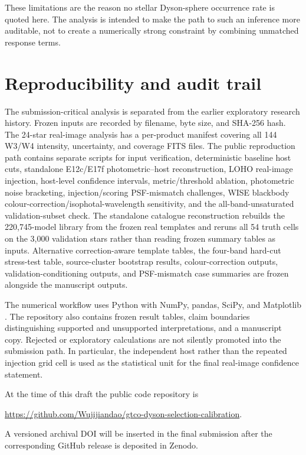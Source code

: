 \documentclass[fleqn,usenatbib]{mnras}
\begin{document}
These limitations are the reason no stellar Dyson-sphere occurrence rate is quoted here. The analysis is intended to make the path to such an inference more auditable, not to create a numerically strong constraint by combining unmatched response terms.

\section{Reproducibility and audit trail}
\label{sec:repro}

The submission-critical analysis is separated from the earlier exploratory research history. Frozen inputs are recorded by filename, byte size, and SHA-256 hash. The 24-star real-image analysis has a per-product manifest covering all 144 W3/W4 intensity, uncertainty, and coverage FITS files. The public reproduction path contains separate scripts for input verification, deterministic baseline host cuts, standalone E12c/E17f photometric--host reconstruction, LOHO real-image injection, host-level confidence intervals, metric/threshold ablation, photometric noise bracketing, injection/scoring PSF-mismatch challenges, WISE blackbody colour-correction/isophotal-wavelength sensitivity, and the all-band-unsaturated validation-subset check. The standalone catalogue reconstruction rebuilds the 220,745-model library from the frozen real templates and reruns all 54 truth cells on the 3,000 validation stars rather than reading frozen summary tables as inputs. Alternative correction-aware template tables, the four-band hard-cut stress-test table, source-cluster bootstrap results, colour-correction outputs, validation-conditioning outputs, and PSF-mismatch case summaries are frozen alongside the manuscript outputs.

The numerical workflow uses Python with NumPy, pandas, SciPy, and Matplotlib \citep{Harris2020,McKinney2010,Virtanen2020,Hunter2007}. The repository also contains frozen result tables, claim boundaries distinguishing supported and unsupported interpretations, and a manuscript copy. Rejected or exploratory calculations are not silently promoted into the submission path. In particular, the independent host rather than the repeated injection grid cell is used as the statistical unit for the final real-image confidence statement.

At the time of this draft the public code repository is
\begin{center}
\url{https://github.com/Wujijiandao/gtco-dyson-selection-calibration}.
\end{center}
A versioned archival DOI will be inserted in the final submission after the corresponding GitHub release is deposited in Zenodo.
\end{document}
